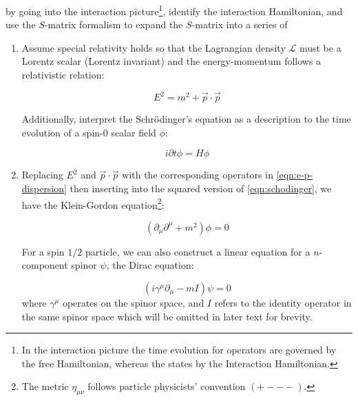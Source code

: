 by going into the
interaction picture\footnote{
    In the interaction picture the time evolution for operators are governed by
    the free Hamiltonian, whereas the states by the Interaction Hamiltonian.
}, identify the interaction Hamiltonian, and use the $S$-matrix formalism to
expand the $S$-matrix into a series of

\begin{enumerate}
    \item Assume special relativity holds so that the Lagrangian density
        $\mathcal{L}$
        must be a Lorentz scalar (Lorentz invariant) and the
        energy-momentum follows a relativistic relation:

        \begin{equation}
            E^2 = m^2 + \vec{p} \cdot \vec{p}
            \label{eqn:e-p-dispersion}
        \end{equation}

        Additionally,
        interpret the Schrödinger's equation as a description to the time
        evolution of a spin-0 scalar field $\phi$:

        \begin{equation}
            i \partial t \phi = H \phi
            \label{eqn:schodinger}
        \end{equation}

    \item Replacing $E^2$ and $\vec{p} \cdot \vec{p}$
        with the corresponding operators in
        \cref{eqn:e-p-dispersion}
        then inserting into the squared version of
        \cref{eqn:schodinger},
        we have the Klein-Gordon equation\footnote{
            The metric $\eta_{\mu\nu}$ follows particle physicists' convention
            $(+ - - -)$.
        }:

        \begin{equation}
            (\partial_\mu \partial^\mu + m^2) \phi = 0
            \label{eqn:k-g}
        \end{equation}

        For a spin $1/2$ particle,
        we can also construct a linear equation for a $n$-component spinor
        $\psi$, the Dirac equation:

        \begin{equation}
            (i \gamma^\mu \partial_\mu - m I) \psi = 0
            \label{eqn:dirac}
        \end{equation}
        where $\gamma^\mu$ operates on the spinor space, and $I$ refers to the
        identity operator in the same spinor space which will be omitted in
        later text for brevity.


\end{enumerate}
